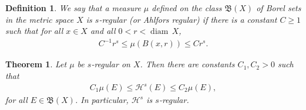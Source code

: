 \documentclass[11pt]{book}
\newtheorem{definition}{Definition}[chapter]
\newtheorem{theorem}{Theorem}[chapter]
\theoremstyle{definition}
\numberwithin{equation}{chapter}
\def\H{{\mathcal H}}
\def\diam{{\operatorname{diam}\,}}
\begin{document}
\medskip

\begin{definition}
We say that a measure $\mu$ defined on the class $\mathfrak{B}(X)$ of Borel sets in the metric space $X$ is $s$-regular (or Ahlfors regular) if there is a constant $C \geq 1$ such that for all $x \in X$ and all $0 < r < \diam X$,
\begin{align*}
    C^{-1}r^s \leq \mu(B(x,r)) \leq Cr^s.
\end{align*}
\end{definition}

\medskip

\begin{theorem}
Let $\mu$ be $s$-regular on $X$. Then there are constants $C_1, C_2 > 0$ such that
\begin{align*}
    C_1 \mu(E) \leq \H^s(E) \leq C_2 \mu(E),
\end{align*}
for all $E \in \mathfrak{B}(X)$. In particular, $\H^s$ is $s$-regular.
\end{theorem}
\end{document}
